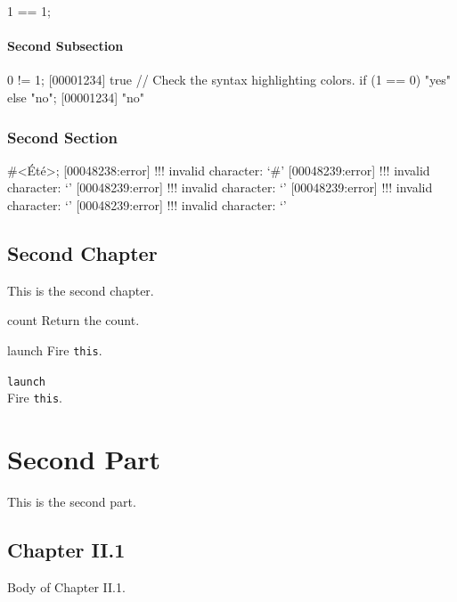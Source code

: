 \documentclass[openright,twoside,11pt]{book}
\begin{document}
\begin{urbiassert}[firstnumber=1]
1 == 1;
\end{urbiassert}

\subsection{Second Subsection}
\begin{urbiscript}
0 != 1;
[00001234] true
// Check the syntax highlighting colors.
if (1 == 0) "yes" else "no";
[00001234] "no"
\end{urbiscript}

\section{Second Section}
\begin{urbiunchecked}[escapeinside=<>]
#<Été>;
[00048238:error] !!! invalid character: `#'
[00048239:error] !!! invalid character: `'
[00048239:error] !!! invalid character: `'
[00048239:error] !!! invalid character: `'
[00048239:error] !!! invalid character: `'
\end{urbiunchecked}

\chapter{Second Chapter}

This is the second chapter.



\begin{urbiscriptapi}
\item[count] Return the count.
\item[launch]
  Fire \lstinline|this|.
\item \lstinline|launch|~\\
  Fire \lstinline|this|.

\end{urbiscriptapi}

\part{Second Part}

This is the second part.

\chapter{Chapter II.1}
Body of Chapter II.1.
\end{document}
